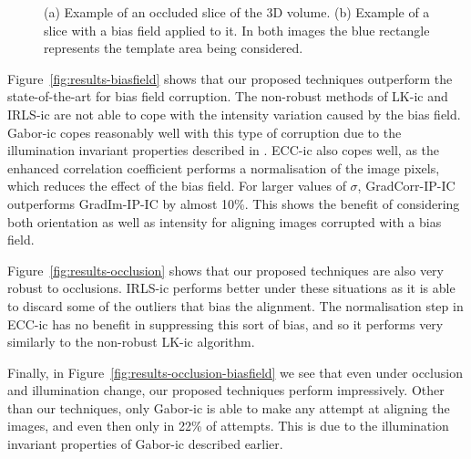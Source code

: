 \begin{figure}[b]
\begin{subfigure}{0.22\textwidth}
                \subcaption{}
                \label{fig:biasfield-example}
        \end{subfigure}
        \caption{(a) Example of an occluded slice of the 3D volume. (b) Example of a slice with a bias field applied to it. In both images the blue rectangle represents the template area being considered.}
        \label{fig:affine-examples}
\end{figure}

Figure~\ref{fig:results-biasfield} shows that our proposed techniques outperform the state-of-the-art for bias field corruption. The non-robust methods of LK-ic and IRLS-ic are not able to cope with the intensity variation caused by the bias field. Gabor-ic copes reasonably well with this type of corruption due to the illumination invariant properties described in \cite{RefWorks:73}. ECC-ic also copes well, as the enhanced correlation coefficient performs a normalisation of the image pixels, which reduces the effect of the bias field. For larger values of $\sigma$, GradCorr-IP-IC outperforms GradIm-IP-IC by almost 10\%. This shows the benefit of considering both orientation as well as intensity for aligning images corrupted with a bias field.

Figure~\ref{fig:results-occlusion} shows that our proposed techniques are also very robust to occlusions. IRLS-ic performs better under these situations as it is able to discard some of the outliers that bias the alignment. The normalisation step in ECC-ic has no benefit in suppressing this sort of bias, and so it performs very similarly to the non-robust LK-ic algorithm.

Finally, in Figure~\ref{fig:results-occlusion-biasfield} we see that even under occlusion and illumination change, our proposed techniques perform impressively. Other than our techniques, only Gabor-ic is able to make any attempt at aligning the images, and even then only in 22\% of attempts. This is due to the illumination invariant properties of Gabor-ic described earlier.